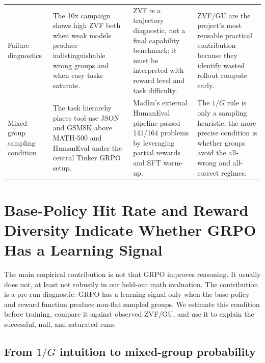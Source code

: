 \documentclass[12pt,a4paper]{report}
\begin{document}
\begin{table}[ht]
\begin{tabularx}{\textwidth}{p{2.45cm}p{4.05cm}p{4.05cm}X}
Failure diagnostics & The 10x campaign shows high ZVF both when weak models produce indistinguishable wrong groups and when easy tasks saturate. & ZVF is a trajectory diagnostic, not a final capability benchmark; it must be interpreted with reward level and task difficulty. & ZVF/GU are the project's most reusable practical contribution because they identify wasted rollout compute early.\\
Mixed-group sampling condition & The task hierarchy places tool-use JSON and GSM8K above MATH-500 and HumanEval under the central Tinker GRPO setup. & Madhu's external HumanEval pipeline passed 141/164 problems by leveraging partial rewards and SFT warm-up. & The $1/G$ rule is only a sampling heuristic; the more precise condition is whether groups avoid the all-wrong and all-correct regimes.\\
\bottomrule
\end{tabularx}
\end{table}

\section{Base-Policy Hit Rate and Reward Diversity Indicate Whether GRPO Has a Learning Signal}
\label{sec:keystone-hit-rate}

The main empirical contribution is not that GRPO improves reasoning. It usually does not, at least not robustly in our held-out math evaluation. The contribution is a pre-run diagnostic: GRPO has a learning signal only when the base policy and reward function produce non-flat sampled groups. We estimate this condition before training, compare it against observed ZVF/GU, and use it to explain the successful, null, and saturated runs.

\subsection*{From $1/G$ intuition to mixed-group probability}
\end{document}
